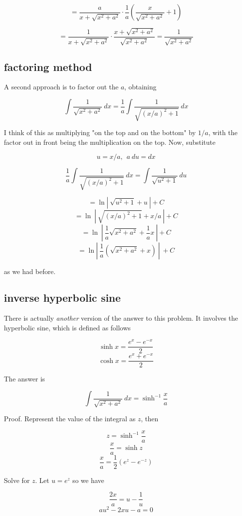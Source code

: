 \documentclass[11pt, oneside]{article}
\begin{document}
\[ =  \frac{a}{x + \sqrt{x^2 + a^2}}  \cdot \frac{1}{a} (\frac{x}{\sqrt{x^2 + a^2}} + 1 ) \]

\[ = \frac{1}{x + \sqrt{x^2 + a^2}}  \cdot \frac{x + \sqrt{x^2 + a^2} }{\sqrt{x^2 + a^2}}  = \frac{1}{\sqrt{x^2 + a^2}} \]

\subsection*{factoring method}

A second approach is to factor out the $a$, obtaining

\[ \int \frac{1}{ \sqrt{x^2 + a^2}} \ dx =  \frac{1}{a}  \int  \frac{1}{ \sqrt{(x/a)^2 + 1}}  \ dx \]

I think of this as multiplying "on the top and on the bottom" by $1/a$, with the factor out in front being the multiplication on the top.  Now, substitute

\[ u = x/a, \ \ a \ du = dx \]

\[ \frac{1}{a}  \int  \frac{1}{ \sqrt{(x/a)^2 + 1}}  \ dx = \int \frac{1}{ \sqrt{u^2 + 1}}\ du \]

\[ = \ln | \ \sqrt{u^2 + 1} + u \ | + C \]
\[ = \ln \ | \ \sqrt{(x/a)^2 + 1} + x/a \ | + C \]
\[ = \ln \ | \ \frac{1}{a} \sqrt{x^2 + a^2} + \frac{1}{a} x \ | + C \]
\[ = \ln | \ \frac{1}{a} ( \sqrt{x^2 + a^2}  + x) \ | \ + C \]

as we had before.

\subsection*{inverse hyperbolic sine}

There is actually \emph{another} version of the answer to this problem.  It involves the hyperbolic sine, which is defined as follows 

\[ \sinh x = \frac{e^x - e^{-x}}{2} \]
\[ \cosh x = \frac{e^x + e^{-x}}{2} \]

The answer is 

\[ \int \frac{1}{ \sqrt{x^2 + a^2}} \ dx = \sinh^{-1} \frac{x}{a} \]

Proof.  Represent the value of the integral as $z$, then

\[ z = \sinh^{-1} \frac{x}{a} \]
\[ \frac{x}{a} = \sinh z \]
\[ \frac{x}{a} = \frac{1}{2} (e^z - e^{-z}) \]

Solve for $z$.  Let $u = e^z$ so we have

\[ \frac{2x}{a} = u - \frac{1}{u} \]
\[ au^2 - 2xu - a = 0 \]
\end{document}
